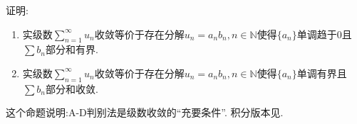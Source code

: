 \documentclass[../../main.tex]{subfiles}
\begin{document}
\begin{proposition}\label{proposition:A-D判别法是级数收敛的“充要条件”}
证明:
\begin{enumerate}
\item 实级数$\sum_{n=1}^\infty u_n$收敛等价于存在分解$u_n=a_nb_n,n\in \mathbb{N}$使得$\{a_n\}$单调趋于$0$且$\sum b_n$部分和有界.

\item 实级数$\sum_{n=1}^\infty u_n$收敛等价于存在分解$u_n=a_nb_n,n\in \mathbb{N}$使得$\{a_n\}$单调有界且$\sum b_n$部分和收敛.
\end{enumerate}
\end{proposition}
\begin{note}
这个命题说明:A-D判别法是级数收敛的“充要条件”.
积分版本见.
\end{note}
\end{document}
